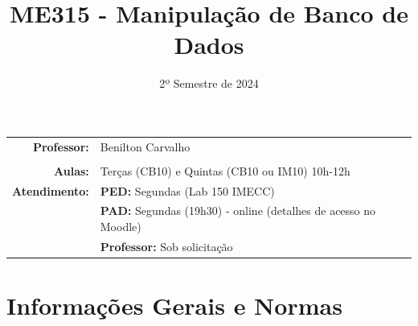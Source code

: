 \documentclass[paper=letter, fontsize=12pt]{scrartcl} %
\title{\normalfont \LARGE ME315 - Manipulação de Banco de Dados}
\subtitle{2º Semestre de 2024}
\author{}
\date{}
\begin{document}
\maketitle

\vspace{-1.5cm}

\noindent
\begin{tabular}{rl}
\textbf{Professor:} & 	 Benilton Carvalho \\
\\
\textbf{Aulas:} & Terças (CB10) e Quintas (CB10 ou IM10) 10h-12h \\
\textbf{Atendimento:} & \textbf{PED:} Segundas (Lab 150 IMECC) \\
& \textbf{PAD:} Segundas (19h30) - online (detalhes de acesso no Moodle) \\
& \textbf{Professor:} Sob solicitação

\end{tabular}

\section{Informações Gerais e Normas}
\end{document}
